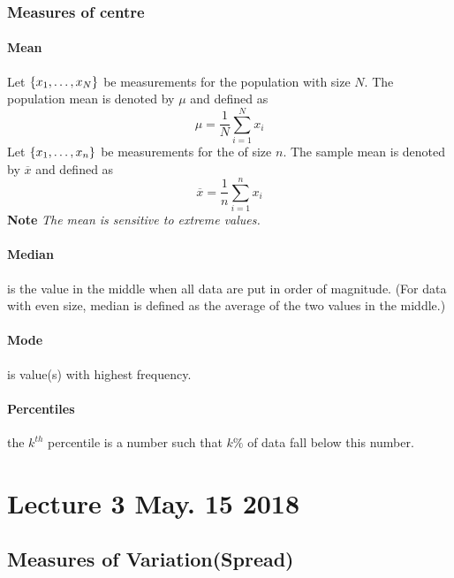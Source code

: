 \documentclass{article}
\begin{document}
		\subsubsection{Measures of centre}
		\paragraph{Mean} Let $\{{{x}_{1}}, \dots, {{x}_{N}}\}$ be measurements for the population with size $N$. The population mean is denoted by $\mu$ and defined as 
			\[
				\mu = \frac{1}{N}\sum_{i=1}^N{x_i}
			\]
		Let $\{{{x}_{1}}, \dots, {{x}_{n}}\}$ be measurements for the  of size $n$. The sample mean is denoted by $\overline{x}$ and defined as 
			\[
				\overline{x} = \frac{1}{n}\sum_{i=1}^n{x_i}
			\]
		\textbf{Note} \emph{The mean is sensitive to extreme values.}
		
		\paragraph{Median} is the value in the middle when all data are put in order of magnitude. (For data with even size, median is defined as the average of the two values in the middle.)
		
		\paragraph{Mode} is value(s) with highest frequency.
		
		\paragraph{Percentiles} the $k^{th}$ percentile is a number such that $k \%$ of data fall below this number.
		
		
	\section{Lecture 3 May. 15 2018}
		\subsection{Measures of Variation(Spread)}
\end{document}
